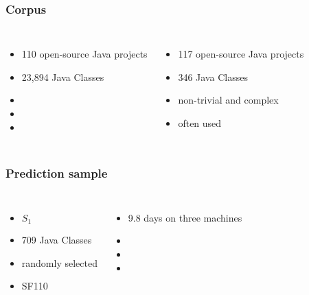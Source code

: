 \begin{frame}
	\frametitle{Corpus}
	
	\begin{columns}[c]
		
		\begin{itemize}
			\item 110 open-source Java projects
			\item 23,894 Java Classes
			\item 
			\item
			\item
		\end{itemize}
		
		\begin{itemize}
			\item 117 open-source Java projects
			\item 346 Java Classes
			\item non-trivial and complex
			\item often used
		\end{itemize}

	\end{columns}
	
\end{frame}

\begin{frame}
	\frametitle{Prediction sample}
	
	\begin{columns}[c]
		
		\column{.45\textwidth}
		\blockheading{}
		\begin{itemize}
			\item $S_1$
			\item 709 Java Classes
			\item randomly selected
			\item SF110
		\end{itemize}
		
		\column{.45\textwidth}
		\blockheading{}
		\begin{itemize}
			\item 9.8 days on three machines
			\item 
			\item 
			\item 
		\end{itemize}

	\end{columns}
	
\end{frame}

